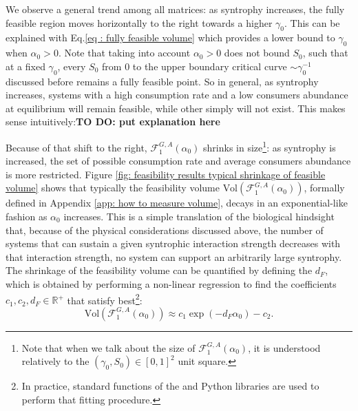 \documentclass[12pt, titlepage]{report}
\begin{document}
  We observe a general trend among all matrices: as syntrophy increases, the fully feasible region moves horizontally to the right towards a higher $\gamma_0$. This can be explained with Eq.\eqref{eq : fully feasible volume} which provides a lower bound to $\gamma_0$ when $\alpha_0 > 0$. Note that taking into account $\alpha_0 >0$ does not bound $S_0$, such that at a fixed $\gamma_0$, every $S_0$ from $0$ to the upper boundary critical curve $\sim \gamma_0^{-1}$ discussed before remains a fully feasible point. So in general, as syntrophy increases, systems with a high consumption rate and a low consumers abundance at equilibrium will remain feasible, while other simply will not exist. This makes sense intuitively:\textbf{TO DO: put explanation here}

  Because of that shift to the right,  $\mathcal{F}^{G,A}_1(\alpha_0)$ shrinks in size\footnote{Note that when we talk about the size of $\mathcal{F}^{G,A}_1(\alpha_0)$, it is understood relatively to the $(\gamma_0, S_0)\in [0,1]^2$ unit square.}: as syntrophy is increased, the set of possible consumption rate and average consumers abundance is more restricted.
  Figure \ref{fig: feasibility results typical shrinkage of feasible volume} shows that typically the feasibility volume $\text{Vol}\left(\mathcal{F}_1^{G,A}(\alpha_0)\right)$, formally defined in Appendix \ref{app: how to measure volume}, decays in an exponential-like fashion as $\alpha_0$ increases. This is a simple translation of the biological hindsight that, because of the physical considerations discussed above, the number of systems that can sustain a given syntrophic interaction strength decreases with that interaction strength, \ie no system can support an arbitrarily large syntrophy.
  The shrinkage of the feasibility volume can be quantified by defining the  $d_F$, which is obtained by performing a non-linear regression to find the coefficients $c_1,c_2, d_F \in \mathbb{R}^+$ that satisfy best\footnote{In practice, standard functions of the  and  Python libraries are used to perform that fitting procedure.}:
  \begin{equation}
\text{Vol}\left(\mathcal{F}_1^{G,A}(\alpha_0)\right) \approx c_1 \exp{\left(-d_F \alpha_0\right)} - c_2. \label{eq: feasibility results fit feasible volume}
  \end{equation}
\end{document}

